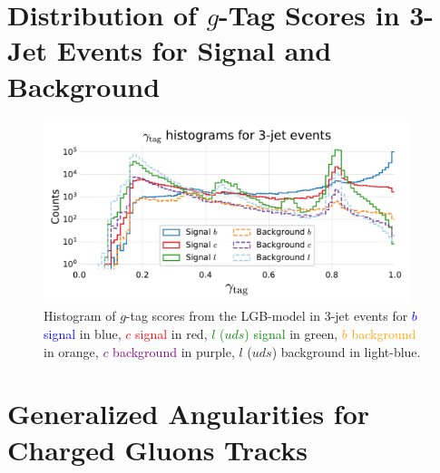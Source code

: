\section[Distribution of g-Tag Scores in 3-Jet Events for Signal and Background]{Distribution of $g$-Tag Scores in 3-Jet Events for Signal and Background}
\begin{figure}[h!]
    \includegraphics[width=0.95\textwidth, trim=10 10 10 45, clip]{figures/quarks/gtag-histogram-sigbkg-down_sample=1.00-ML_vars=vertex-selection=b-ejet_min=4-n_iter_RS_lgb=99-n_iter_RS_xgb=9-cdot_cut=0.90-version=19-njet=3.pdf}
    \caption[Distribution of $g$-Tag Scores in 3-Jet Events for Signal and Background]
            {Histogram of $g$-tag scores from the LGB-model in 3-jet events for \textcolor{blue}{$b$ signal} in blue, \textcolor{red}{$c$ signal} in red, \textcolor{green}{$l$ ($uds$) signal} in green, \textcolor{orange}{$b$ background} in orange, \textcolor{purple}{$c$ background} in purple, \textcolor{light-blue}{$l$ ($uds$) background} in light-blue.   } 
\end{figure}
\clearpage



\FloatBarrier
\section{Generalized Angularities for Charged Gluons Tracks}


